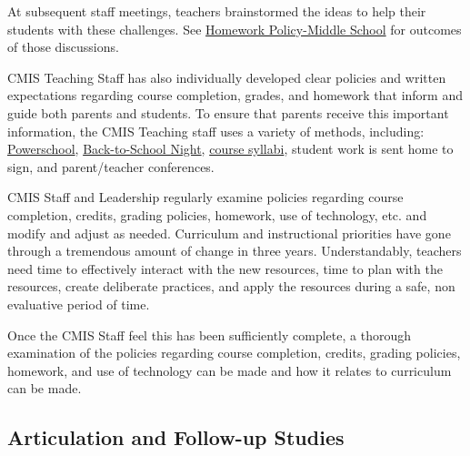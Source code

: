 \begin{findings}
At subsequent staff meetings, teachers brainstormed the ideas to help their students with these challenges. See \href{https://docs.google.com/a/cmis.ac.th/document/d/16b9QZYYXoRK-nJdFtCsW13NB9IwzAu8rlmTMnJ6usdo/edit?usp=sharing}{Homework Policy-Middle School} for outcomes of those discussions. 


CMIS Teaching Staff has also individually developed clear policies and written expectations regarding course completion, grades, and homework that inform and guide both parents and students. To ensure that parents receive this important information, the CMIS Teaching staff uses a variety of methods, including: \href{https://cmis.powerschool.com/teachers/pw.html}{Powerschool}, \href{https://drive.google.com/drive/folders/0B0TYmzaZNi3fZTFCbmEtZzdVZnM?usp=sharing}{Back-to-School Night}, \href{https://drive.google.com/drive/folders/0ByVFfrm0zfolNmdnMzU2S2xRSWs?usp=sharing}{course syllabi}, student work is sent home to sign, and parent/teacher conferences. 


CMIS Staff and Leadership regularly examine policies regarding course completion, credits, grading policies, homework, use of technology, etc. and modify and adjust as needed. Curriculum and instructional priorities have gone through a tremendous amount of change in three years. Understandably, teachers need time to effectively interact with the new resources, time to plan with the resources, create deliberate practices, and apply the resources during a safe, non evaluative period of time. 

Once the CMIS Staff feel this has been sufficiently complete, a thorough examination of the policies regarding course completion, credits, grading policies, homework, and use of technology can be made and how it relates to curriculum can be made. 
\end{findings}

\subsection{Articulation and Follow-up Studies}



